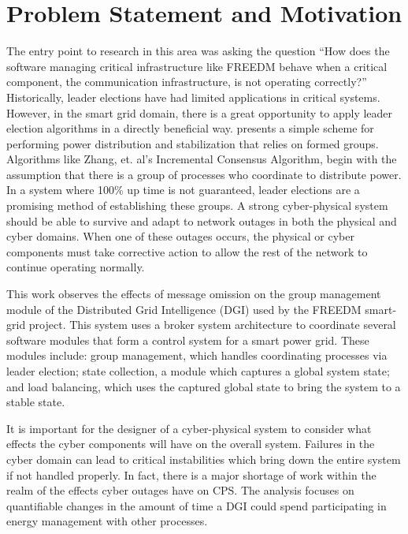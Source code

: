 \chapter{Problem Statement and Motivation}

The entry point to research in this area was asking the question ``How does the software managing critical infrastructure like FREEDM behave when a critical component, the communication infrastructure, is not operating correctly?'' 
Historically, leader elections have had limited applications in critical systems. However, in the smart grid domain, there is a great opportunity to apply leader election algorithms in a directly beneficial way. \cite{LOADBALANCING} presents a simple scheme for performing power distribution and stabilization that relies on formed groups. Algorithms like Zhang, et. al's Incremental Consensus Algorithm\cite{INCREMENTALCONSENSUS}, begin with the assumption that there is a group of processes who coordinate to distribute power. In a system where 100\% up time is not guaranteed, leader elections are a promising method of establishing these groups.
A strong cyber-physical system should be able to survive and adapt to network outages in both the physical and cyber domains. When one of these outages occurs, the physical or cyber components must take corrective action to allow the rest of the network to continue operating normally.

This work observes the effects of message omission on the group management module of the Distributed Grid Intelligence (DGI) used by the FREEDM smart-grid project. This system uses a broker system architecture to coordinate several software modules that form a control system for a smart power grid. These modules include: group management, which handles coordinating processes via leader election; state collection, a module which
captures a global system state; and load balancing, which uses the captured global state to bring the system to a stable state.

It is important for the designer of a cyber-physical system to consider what effects the cyber components will have on the overall system. Failures in the cyber domain can lead to critical instabilities which bring down the entire system if not handled properly.  In fact, there is a major shortage of work within the realm of the effects cyber outages have on \ac{CPS}\cite{CYBERRESEARCHCALL}\cite{SMARTGRIDBENEFITS}.
The analysis focuses on quantifiable changes in the amount of time a \ac{DGI} could spend participating in energy management with other processes.

